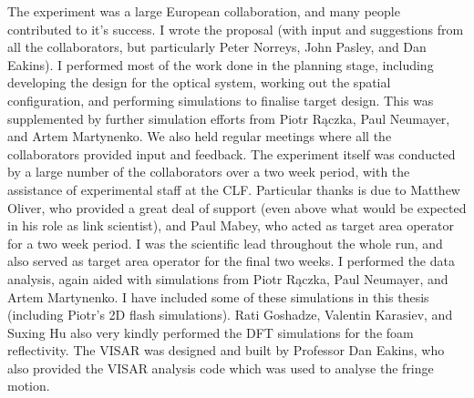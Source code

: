 
The experiment was a large European collaboration, and many people contributed to it's success. I wrote the proposal (with input and suggestions from all the collaborators, but particularly Peter Norreys, John Pasley, and Dan Eakins). I performed most of the work done in the planning stage, including developing the design for the optical system, working out the spatial configuration, and performing simulations to finalise target design. This was supplemented by further simulation efforts from Piotr R\k{a}czka, Paul Neumayer, and Artem Martynenko. We also held regular meetings where all the collaborators provided input and feedback. The experiment itself was conducted by a large number of the collaborators over a two week period, with the assistance of experimental staff at the CLF. Particular thanks is due to Matthew Oliver, who provided a great deal of support (even above what would be expected in his role as link scientist), and Paul Mabey, who acted as target area operator for a two week period. I was the scientific lead throughout the whole run, and also served as target area operator for the final two weeks. I performed the data analysis, again aided with simulations from Piotr R\k{a}czka, Paul Neumayer, and Artem Martynenko. I have included some of these simulations in this thesis (including Piotr's 2D flash simulations). Rati Goshadze, Valentin  Karasiev, and Suxing Hu also very kindly performed the DFT simulations for the foam reflectivity. The VISAR was designed and built by Professor Dan Eakins, who also provided the VISAR analysis code which was used to analyse the fringe motion.

